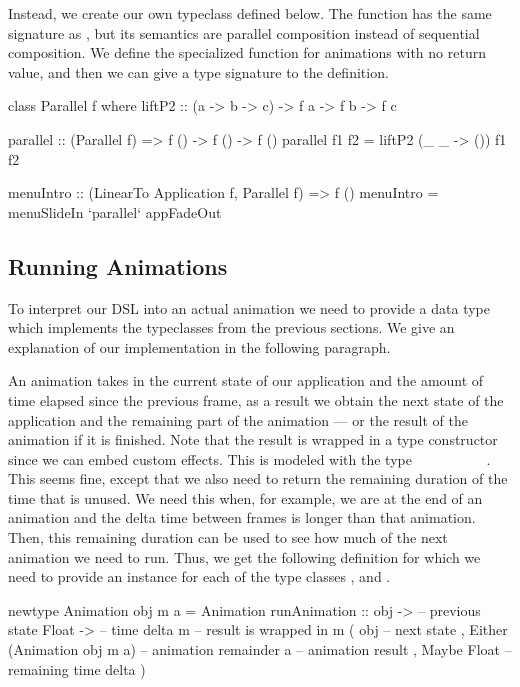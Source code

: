 Instead, we create our own  typeclass defined below. The function  has the same signature as , but its semantics are parallel composition instead of sequential composition. We define the specialized  function for animations with no return value, and then we can give a type signature to the  definition.

\begin{code}
class Parallel f where
  liftP2 :: (a -> b -> c) -> f a -> f b -> f c

parallel :: (Parallel f) => f () -> f () -> f ()
parallel f1 f2 = liftP2 (\_ _ -> ()) f1 f2

menuIntro :: (LinearTo Application f, Parallel f) => f ()
menuIntro = menuSlideIn `parallel` appFadeOut
\end{code}

\subsection{Running Animations}

To interpret our DSL into an actual animation we need to provide a data type which implements the typeclasses from the previous sections. We give an explanation of our implementation in the following paragraph.

An animation takes in the current state of our application and the amount of time elapsed since the previous frame, as a result we obtain the next state of the application and the remaining part of the animation --- or the result of the animation if it is finished. Note that the result is wrapped in a type constructor  since we can embed custom effects. This is modeled with the type ~\hs{->}~~\hs{->}~~~~~~~. This seems fine, except that we also need to return the remaining duration of the time that is unused. We need this when, for example, we are at the end of an animation and the delta time between frames is longer than that animation. Then, this remaining duration can be used to see how much of the next animation we need to run. Thus, we get the following definition for which we need to provide an instance for each of the type classes ,  and .

\begin{code}
newtype Animation obj m a = Animation {
  runAnimation ::
    obj -> -- previous state
    Float -> -- time delta
    m -- result is wrapped in m
      ( obj -- next state
      , Either
          (Animation obj m a) -- animation remainder
          a -- animation result
      , Maybe Float -- remaining time delta
      )
}
\end{code}

